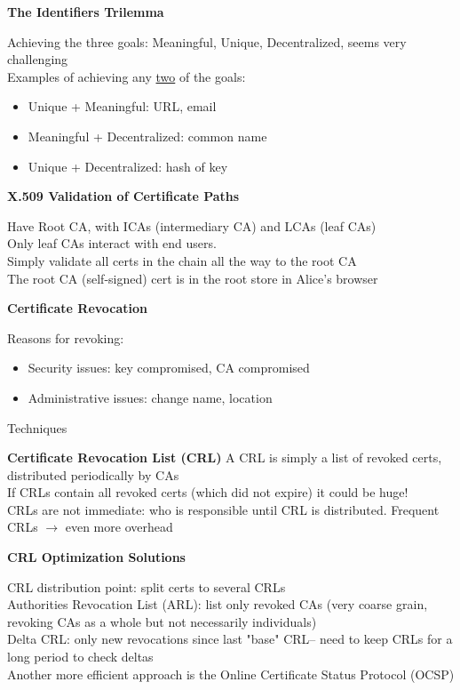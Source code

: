 \documentclass{article}
\begin{document}
\textbf{The Identifiers Trilemma}

Achieving the three goals: Meaningful, Unique, Decentralized, seems very challenging\\
Examples of achieving any \underline{two} of the goals:\begin{itemize}
	\item Unique + Meaningful: URL, email
	\item Meaningful + Decentralized: common name
	\item Unique + Decentralized: hash of key
\end{itemize}

\textbf{X.509 Validation of Certificate Paths}

Have Root CA, with ICAs (intermediary CA) and LCAs (leaf CAs)\\
Only leaf CAs interact with end users.\\
Simply validate all certs in the chain all the way to the root CA\\
The root CA (self-signed) cert is in the root store in Alice's browser

\textbf{Certificate Revocation}

Reasons for revoking:\begin{itemize}
	\item Security issues: key compromised, CA compromised
	\item Administrative issues: change name, location
\end{itemize}
Techniques

\textbf{Certificate Revocation List (CRL)}
A CRL is simply a list of revoked certs, distributed periodically by CAs\\
If CRLs contain all revoked certs (which did not expire) it could be huge!\\
CRLs are not immediate: who is responsible until CRL is distributed. Frequent CRLs $\rightarrow$ even more overhead

\textbf{CRL Optimization Solutions}

CRL distribution point: split certs to several CRLs\\
Authorities Revocation List (ARL): list only revoked CAs (very coarse grain, revoking CAs as a whole but not necessarily individuals)\\
Delta CRL: only new revocations since last "base" CRL-- need to keep CRLs for a long period to check deltas\\
Another more efficient approach is the Online Certificate Status Protocol (OCSP)
\end{document}
